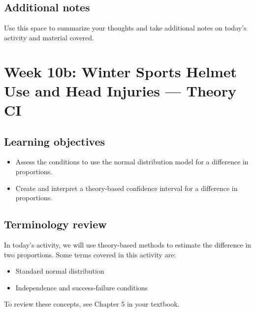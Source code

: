 \documentclass[
]{report}
\begin{document}
\hypertarget{additional-notes-16}{%
\subsection{Additional notes}\label{additional-notes-16}}

Use this space to summarize your thoughts and take additional notes on today's activity and material covered.

\newpage

\hypertarget{week-10b-winter-sports-helmet-use-and-head-injuries-theory-ci}{%
\section{Week 10b: Winter Sports Helmet Use and Head Injuries --- Theory CI}\label{week-10b-winter-sports-helmet-use-and-head-injuries-theory-ci}}


\hypertarget{learning-objectives-16}{%
\subsection{Learning objectives}\label{learning-objectives-16}}

\begin{itemize}
\item
  Assess the conditions to use the normal distribution model for a difference in proportions.
\item
  Create and interpret a theory-based confidence interval for a difference in proportions.
\end{itemize}

\hypertarget{terminology-review-18}{%
\subsection{Terminology review}\label{terminology-review-18}}

In today's activity, we will use theory-based methods to estimate the difference in two proportions. Some terms covered in this activity are:

\begin{itemize}
\item
  Standard normal distribution
\item
  Independence and success-failure conditions
\end{itemize}

To review these concepts, see Chapter 5 in your textbook.
\end{document}
